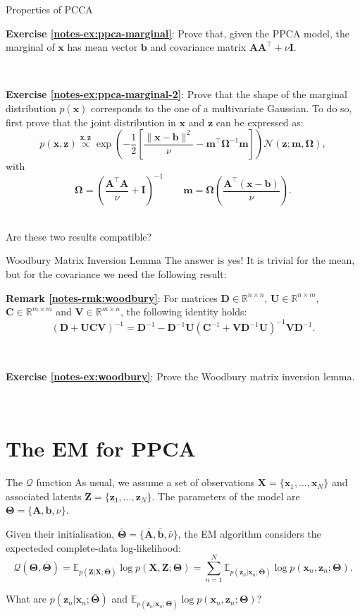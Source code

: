 \documentclass{beamer}
\newcommand{\bs}[1]{\boldsymbol{#1}}
\newcommand{\exercise}[2]{\noindent\colorbox{blue!10}{\parbox{0.995\textwidth}{\textbf{Exercise \ref{notes-ex:#1}}: #2}}\\}
\newcommand{\remark}[2]{\noindent\colorbox{red!10}{\parbox{0.995\textwidth}{\textbf{Remark \ref{notes-rmk:#1}}: #2}}\\}
\begin{document}
\begin{frame}{Properties of PCCA}
\exercise{ppca-marginal}{Prove that, given the PPCA model, the marginal of $\bs{x}$ has mean vector $\bs{b}$ and covariance matrix $\bs{A}\bs{A}^\top+\nu\bs{I}$.}\pause\vspace{3mm}

\exercise{ppca-marginal-2}{Prove that the shape of the marginal distribution $p(\bs{x})$ corresponds to the one of a multivariate Gaussian. To do so, first prove that the joint distribution in $\bs{x}$ and $\bs{z}$ can be expressed as:
\[
 p(\bs{x},\bs{z})\stackrel{\bs{x},\bs{z}}{\propto} \exp\left(-\frac{1}{2}\left[ \frac{\|\bs{x}-\bs{b}\|^2}{\nu}-\bs{m}^\top\bs{\Omega}^{-1}\bs{m}\right]\right)\mathcal{N}(\bs{z};\bs{m},\bs{\Omega}),
\]
with
\[
 \bs{\Omega} = \left(\frac{\bs{A}^\top\bs{A}}{\nu}+\bs{I}\right)^{-1} \qquad \bs{m}=\bs{\Omega}\left(\frac{\bs{A}^\top(\bs{x}-\bs{b})}{\nu}\right) .
\]
}\pause\vspace{3mm}
Are these two results compatible?
\end{frame}

\begin{frame}{Woodbury Matrix Inversion Lemma}
The answer is yes! It is trivial for the mean, but for the covariance we need the following result:\vspace{3mm}
\remark{woodbury}{For matrices $\bs{D}\in\mathbb{R}^{n\times n}$, $\bs{U}\in\mathbb{R}^{n\times m}$, $\bs{C}\in\mathbb{R}^{m\times m}$ and $\bs{V}\in\mathbb{R}^{m\times n}$, the following identity holds:
\[
 (\bs{D} + \bs{U}\bs{C}\bs{V})^{-1} = \bs{D}^{-1}-\bs{D}^{-1}\bs{U}(\bs{C}^{-1}+\bs{V}\bs{D}^{-1}\bs{U})^{-1}\bs{V}\bs{D}^{-1}.
\]
}\vspace{3mm}

\exercise{woodbury}{Prove the Woodbury matrix inversion lemma.}

\end{frame}

\section{The EM for PPCA}

\begin{frame}{The $\mathcal{Q}$ function}
As usual, we assume a set of observations $\bs{X}=\{\bs{x}_1,\ldots,\bs{x}_N\}$ and associated latents $\bs{Z}=\{\bs{z}_1,\ldots,\bs{z}_N\}$. The parameters of the model are $\bs{\Theta}=\{\bs{A},\bs{b},\nu\}$. \vspace{3mm}

Given their initialisation, $\bar{\bs{\Theta}}=\{\bar{\bs{A}},\bar{\bs{b}},\bar{\nu}\}$, the EM algorithm considers the expecteded complete-data log-likelihood:
\[
 \mathcal{Q}(\bs{\Theta},\bar{\bs{\Theta}}) =\mathbb{E}_{p(\bs{Z}|\bs{X};\bar{\bs{\Theta}})} \log p(\bs{X},\bs{Z};\bs{\Theta})  = \sum_{n=1}^N \mathbb{E}_{p(\bs{z}_n|\bs{x}_n;\bar{\bs{\Theta}})} \log p(\bs{x}_n,\bs{z}_n;\bs{\Theta}).
\]\vspace{3mm}

What are $p(\bs{z}_n|\bs{x}_n;\bar{\bs{\Theta}})$ and $\mathbb{E}_{p(\bs{z}_n|\bs{x}_n;\bar{\bs{\Theta}})} \log p(\bs{x}_n,\bs{z}_n;\bs{\Theta})$?
\end{frame}
\end{document}
